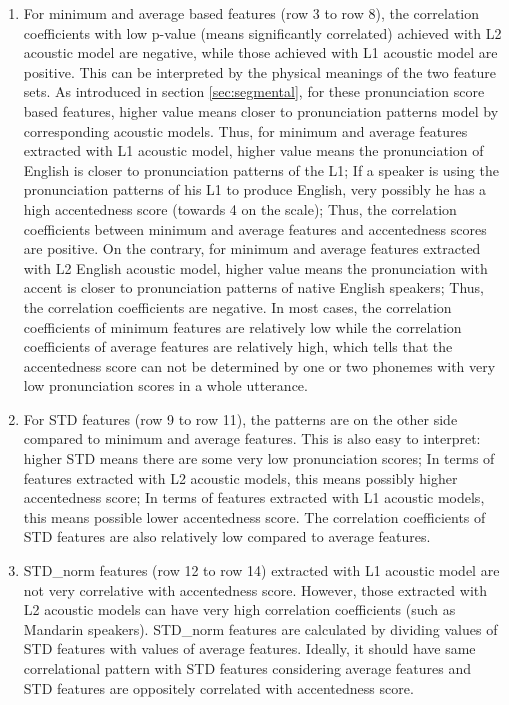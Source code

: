 \begin{enumerate}
 \item For minimum and average based features (row 3 to row 8), the correlation coefficients with low p-value (means significantly correlated) achieved with L2 acoustic model are negative, while those achieved with L1 acoustic model are positive. This can be interpreted by the physical meanings of the two feature sets. As introduced in section \ref{sec:segmental}, for these pronunciation score based features, higher value means closer to pronunciation patterns model by corresponding acoustic models. Thus, for minimum and average features extracted with L1 acoustic model, higher value means the pronunciation of English is closer to pronunciation patterns of the L1; If a speaker is using the pronunciation patterns of his L1 to produce English, very possibly he has a high accentedness score (towards 4 on the scale); Thus, the correlation coefficients between minimum and average features and accentedness scores are positive. On the contrary, for minimum and average features extracted with L2 English acoustic model, higher value means the pronunciation with accent is closer to pronunciation patterns of native English speakers; Thus, the correlation coefficients are negative. In most cases, the correlation coefficients of minimum features are relatively low while the correlation coefficients of average features are relatively high, which tells that the accentedness score can not be determined by one or two phonemes with very low pronunciation scores in a whole utterance.
 \item For STD features (row 9 to row 11), the patterns are on the other side compared to minimum and average features. This is also easy to interpret: higher STD means there are some very low pronunciation scores; In terms of features extracted with L2 acoustic models, this means possibly higher accentedness score; In terms of features extracted with L1 acoustic models, this means possible lower accentedness score. The correlation coefficients of STD features are also relatively low compared to average features.
 \item STD\_norm features (row 12 to row 14) extracted with L1 acoustic model are not very correlative with accentedness score. However, those extracted with L2 acoustic models can have very high correlation coefficients (such as Mandarin speakers). STD\_norm features are calculated by dividing values of STD features with values of average features. Ideally, it should have same correlational pattern with STD features considering average features and STD features are oppositely correlated with accentedness score.

\end{enumerate}
